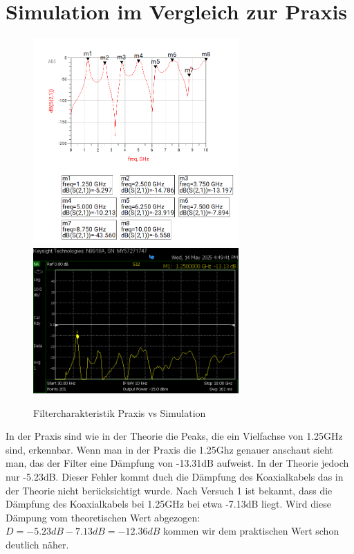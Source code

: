     \section{Simulation im Vergleich zur Praxis}
    \begin{figure}[H]
        \includegraphics[width=0.7\textwidth]{Pictures/simulationmitmarkern32.8.png}
        \includegraphics[width=0.7\textwidth]{Pictures/S12neuCooleGrupp.png}
        \centering
        \caption{Filtercharakteristik Praxis vs Simulation}
    \end{figure}
    In der Praxis sind wie in der Theorie die Peaks, die ein Vielfachse von 1.25GHz sind, erkennbar.
    Wenn man in der Praxis die 1.25Ghz genauer anschaut sieht man, das der Filter eine Dämpfung von -13.31dB
    aufweist. In der Theorie jedoch nur -5.23dB. Dieser Fehler kommt duch die Dämpfung des Koaxialkabels
    das in der Theorie nicht berücksichtigt wurde.
    Nach Versuch 1 ist bekannt, dass die Dämpfung des Koaxialkabels bei 1.25GHz bei etwa -7.13dB liegt.
    Wird diese Dämpung vom theoretischen Wert abgezogen: $D=-5.23dB-7.13dB=-12.36dB$ 
    kommen wir dem praktischen Wert schon deutlich näher.
     




